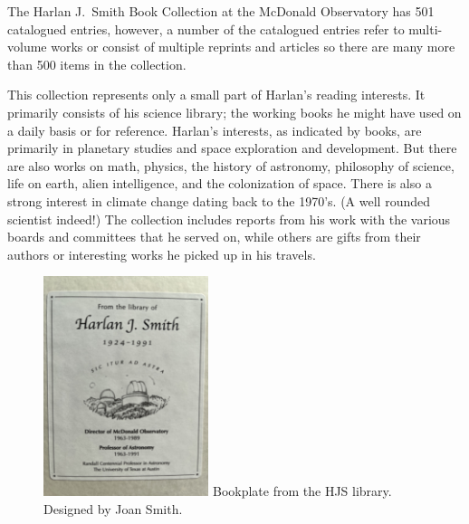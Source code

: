 

The Harlan J.~Smith Book Collection at the McDonald Observatory has 501
catalogued entries, however, a number of the catalogued entries refer
to multi-volume works or consist of multiple reprints and articles so
there are many more than 500 items in the collection.

This collection represents only a small part of Harlan's reading
interests.  It primarily consists of his science library; the working
books he might have used on a daily basis or for reference.  Harlan's
interests, as indicated by books, are primarily in planetary studies
and space exploration and development. But there are also works on
math, physics, the history of astronomy, philosophy of science, life
on earth, alien intelligence, and the colonization of space. There is
also a strong interest in climate change dating back to the 1970's. (A
well rounded scientist indeed!) The collection includes reports from
his work with the various boards and committees that he served on,
while others are gifts from their authors or interesting works he
picked up in his travels.

\begin{figure}
  \centering
  \includegraphics[width=0.43\textwidth]{hjs_bookplate_small.png}
  {\small Bookplate from the HJS library. Designed by Joan Smith.}
  \label{fig:bookplate}
\end{figure}


